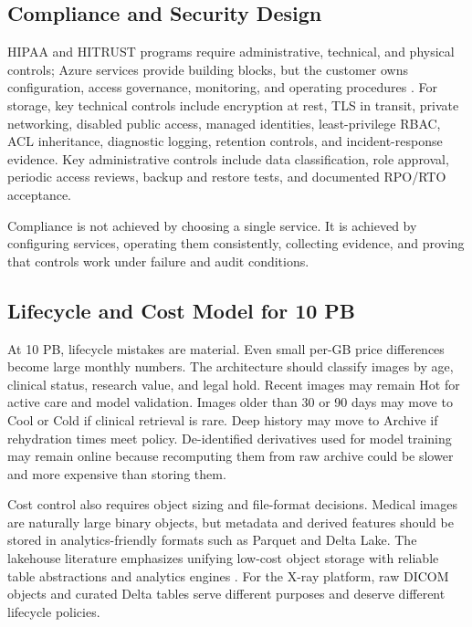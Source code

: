\subsection{Compliance and Security Design}
HIPAA and HITRUST programs require administrative, technical, and physical controls; Azure services provide building blocks, but the customer owns configuration, access governance, monitoring, and operating procedures \cite{microsoft2025hipaa}. For storage, key technical controls include encryption at rest, TLS in transit, private networking, disabled public access, managed identities, least-privilege RBAC, ACL inheritance, diagnostic logging, retention controls, and incident-response evidence. Key administrative controls include data classification, role approval, periodic access reviews, backup and restore tests, and documented RPO/RTO acceptance.

\begin{notebox}
Compliance is not achieved by choosing a single service. It is achieved by configuring services, operating them consistently, collecting evidence, and proving that controls work under failure and audit conditions.
\end{notebox}

\subsection{Lifecycle and Cost Model for 10 PB}
At 10 PB, lifecycle mistakes are material. Even small per-GB price differences become large monthly numbers. The architecture should classify images by age, clinical status, research value, and legal hold. Recent images may remain Hot for active care and model validation. Images older than 30 or 90 days may move to Cool or Cold if clinical retrieval is rare. Deep history may move to Archive if rehydration times meet policy. De-identified derivatives used for model training may remain online because recomputing them from raw archive could be slower and more expensive than storing them.

Cost control also requires object sizing and file-format decisions. Medical images are naturally large binary objects, but metadata and derived features should be stored in analytics-friendly formats such as Parquet and Delta Lake. The lakehouse literature emphasizes unifying low-cost object storage with reliable table abstractions and analytics engines \cite{armbrust2021lakehouse,armbrust2020delta}. For the X-ray platform, raw DICOM objects and curated Delta tables serve different purposes and deserve different lifecycle policies.

